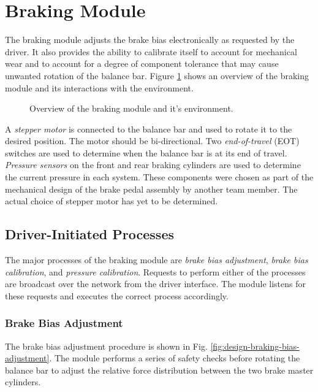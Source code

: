 \section{Braking Module\label{sec:Braking-Module-Design}}

The braking module adjusts the brake bias electronically as requested by the driver. It also provides the ability to calibrate itself to account for mechanical wear and to account for a degree of component tolerance that may cause unwanted rotation of the balance bar. Figure \ref{fig:design_brake_overview_block} shows an overview of the braking module and its interactions with the environment. 

\begin{figure}[H]
\centering

\caption{Overview of the braking module and it's environment.}
\label{fig:design_brake_overview_block}
\end{figure}

A \emph{stepper motor} is connected to the balance bar and used to rotate it to the desired position. The motor should be bi-directional. Two \emph{end-of-travel} (EOT) switches are used to determine when the balance bar is at its end of travel. \emph{Pressure sensors} on the front and rear braking cylinders are used to determine the current pressure in each system. These components were chosen as part of the mechanical design of the brake pedal assembly by another team member. The actual choice of stepper motor has yet to be determined.

\subsection{Driver-Initiated Processes \label{sec:braking_processes}}

The major processes of the braking module are \emph{brake bias adjustment}, \emph{brake bias calibration}, and \emph{pressure calibration}. Requests to perform either of the processes are broadcast over the network from the driver interface. The module listens for these requests and executes the correct process accordingly. 

\subsubsection{Brake Bias Adjustment}

The brake bias adjustment procedure is shown in Fig. \ref{fig:design-braking-bias-adjustment}. The module performs a series of safety checks before rotating the balance bar to adjust the relative force distribution between the two brake master cylinders.

